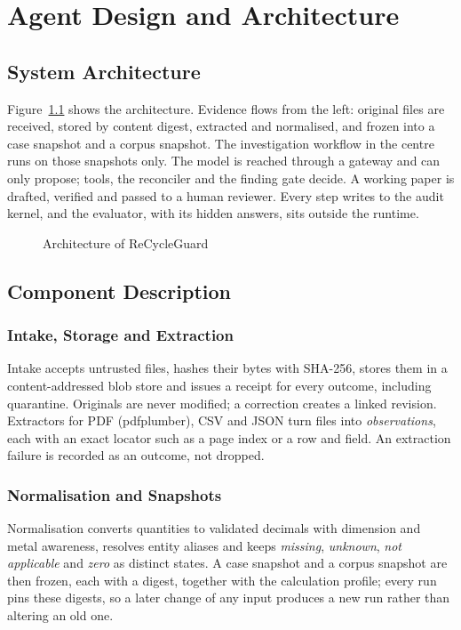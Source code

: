 \chapter{Agent Design and Architecture}

\section{System Architecture}
Figure~\ref{fig:arch} shows the architecture. Evidence flows from the left: original files are
received, stored by content digest, extracted and normalised, and frozen into a case snapshot and
a corpus snapshot. The investigation workflow in the centre runs on those snapshots only. The
model is reached through a gateway and can only propose; tools, the reconciler and the finding
gate decide. A working paper is drafted, verified and passed to a human reviewer. Every step
writes to the audit kernel, and the evaluator, with its hidden answers, sits outside the runtime.

\begin{figure}[htbp]
\centering

\caption{Architecture of ReCycleGuard}
\label{fig:arch}
\end{figure}

\section{Component Description}

\subsection{Intake, Storage and Extraction}
Intake accepts untrusted files, hashes their bytes with SHA-256, stores them in a content-addressed
blob store and issues a receipt for every outcome, including quarantine. Originals are never
modified; a correction creates a linked revision. Extractors for PDF (pdfplumber), CSV and JSON
turn files into \emph{observations}, each with an exact locator such as a page index or a row and
field. An extraction failure is recorded as an outcome, not dropped.

\subsection{Normalisation and Snapshots}
Normalisation converts quantities to validated decimals with dimension and metal awareness,
resolves entity aliases and keeps \emph{missing}, \emph{unknown}, \emph{not applicable} and
\emph{zero} as distinct states. A case snapshot and a corpus snapshot are then frozen, each with a
digest, together with the calculation profile; every run pins these digests, so a later change of
any input produces a new run rather than altering an old one.

